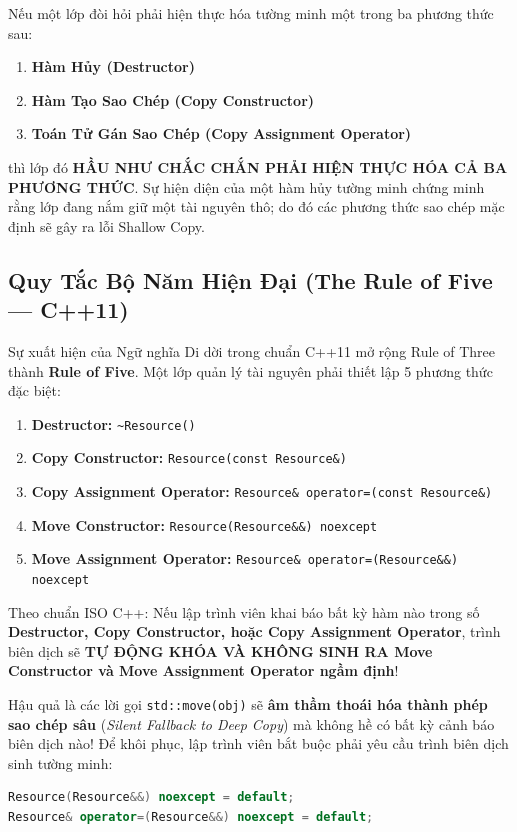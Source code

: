 \documentclass[12pt,a4paper,oneside]{book}
\begin{document}
\begin{theorybox}
Nếu một lớp đòi hỏi phải hiện thực hóa tường minh một trong ba phương thức sau:
\begin{enumerate}
    \item \textbf{Hàm Hủy (Destructor)}
    \item \textbf{Hàm Tạo Sao Chép (Copy Constructor)}
    \item \textbf{Toán Tử Gán Sao Chép (Copy Assignment Operator)}
\end{enumerate}
thì lớp đó \textbf{HẦU NHƯ CHẮC CHẮN PHẢI HIỆN THỰC HÓA CẢ BA PHƯƠNG THỨC}. Sự hiện diện của một hàm hủy tường minh chứng minh rằng lớp đang nắm giữ một tài nguyên thô; do đó các phương thức sao chép mặc định sẽ gây ra lỗi Shallow Copy.
\end{theorybox}

\subsection{Quy Tắc Bộ Năm Hiện Đại (The Rule of Five --- C++11)}

Sự xuất hiện của Ngữ nghĩa Di dời trong chuẩn C++11 mở rộng Rule of Three thành \textbf{Rule of Five}. Một lớp quản lý tài nguyên phải thiết lập 5 phương thức đặc biệt:
\begin{enumerate}
    \item \textbf{Destructor:} \texttt{\textasciitilde{}Resource()}
    \item \textbf{Copy Constructor:} \texttt{Resource(const Resource\&)}
    \item \textbf{Copy Assignment Operator:} \texttt{Resource\& operator=(const Resource\&)}
    \item \textbf{Move Constructor:} \texttt{Resource(Resource\&\&) noexcept}
    \item \textbf{Move Assignment Operator:} \texttt{Resource\& operator=(Resource\&\&) noexcept}
\end{enumerate}

\begin{warningbox}
Theo chuẩn ISO C++: Nếu lập trình viên khai báo bất kỳ hàm nào trong số \textbf{Destructor, Copy Constructor, hoặc Copy Assignment Operator}, trình biên dịch sẽ \textbf{TỰ ĐỘNG KHÓA VÀ KHÔNG SINH RA Move Constructor và Move Assignment Operator ngầm định}!

Hậu quả là các lời gọi \texttt{std::move(obj)} sẽ \textbf{âm thầm thoái hóa thành phép sao chép sâu} (\textit{Silent Fallback to Deep Copy}) mà không hề có bất kỳ cảnh báo biên dịch nào! Để khôi phục, lập trình viên bắt buộc phải yêu cầu trình biên dịch sinh tường minh:
\begin{lstlisting}[language=C++]
Resource(Resource&&) noexcept = default;
Resource& operator=(Resource&&) noexcept = default;
\end{lstlisting}
\end{warningbox}
\end{document}
